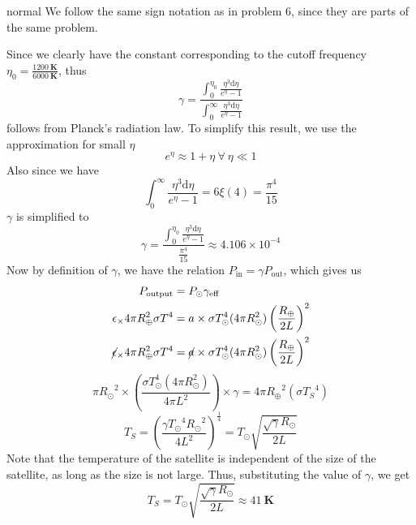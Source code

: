 \begin{solution}{normal}
We follow the same sign notation as in problem 6, since they are parts of the same problem. 
\vspace{3mm}

\noindent Since we clearly have the constant corresponding to the cutoff frequency $\eta_0 = \frac{1200\ \textbf{K}}{6000\ \textbf{K}}$, thus$$\gamma = \frac{\int_{0}^{\eta_0}{\frac{\eta^3\text{d}\eta}{e^\eta - 1}}}{\int_{0}^{\infty}{\frac{\eta^3\text{d}\eta}{e^\eta - 1}}}$$ follows from Planck's radiation law.  To simplify this result, we use the approximation for small $\eta$ $$e^\eta \approx 1+ \eta \ \forall \  \eta \ll 1$$ Also since we have $$\int_{0}^{\infty}{\frac{\eta^3\text{d}\eta}{e^\eta - 1}} = 6\xi(4) = \frac{\pi^4}{15}$$ $\gamma$ is simplified to $$\gamma =  \frac{\int_{0}^{\eta_0}{\frac{\eta^3\text{d}\eta}{e^\eta - 1}}}{\tfrac{\pi^4}{15}} \approx 4.106 \times 10^{-4}$$ Now by definition of $\gamma$, we have the relation $P_{\text{in}} = \gamma P_{\text{out}}$, which gives us
\begin{align*}
P_\text{output} &= P_\odot \gamma_\text{eff}\\
\epsilon_ \times 4\pi R_\oplus^2\sigma T^4 &=
a \times \sigma T_\odot^4 (4\pi R_\odot^2)\left(\frac{R_\oplus}{2L}\right)^2 \\
\cancel\epsilon_ \times 4\pi R_\oplus^2\sigma T^4 &=
\cancel a \times \sigma T_\odot^4 (4\pi R_\odot^2)\left(\frac{R_\oplus}{2L}\right)^2 \\
\end{align*}
$$\pi {R_{\odot}}^2 \times \left(\frac{\sigma T_\odot^4 (4\pi R_\odot^2)}{4\pi L^2}\right) \times \gamma = 4\pi {R_{\oplus}}^2 (\sigma {T_S}^4)$$
$$T_S = {\left( \frac{\gamma {T_{\odot}}^4 {R_{\odot}}^2}{4L^2}\right)}^{\frac{1}{4}}  = T_\odot \sqrt{\frac{\sqrt{\gamma}R_\odot}{2L}} $$ 
Note that the temperature of the satellite is independent of the size of the satellite, as long as the size is not large. Thus, substituting the value of $\gamma$, we get $$T_S = T_\odot \sqrt{\frac{\sqrt{\gamma}R_\odot}{2L}}  \approx \boxed{41 \ \textbf{K}}$$ 
\end{solution}